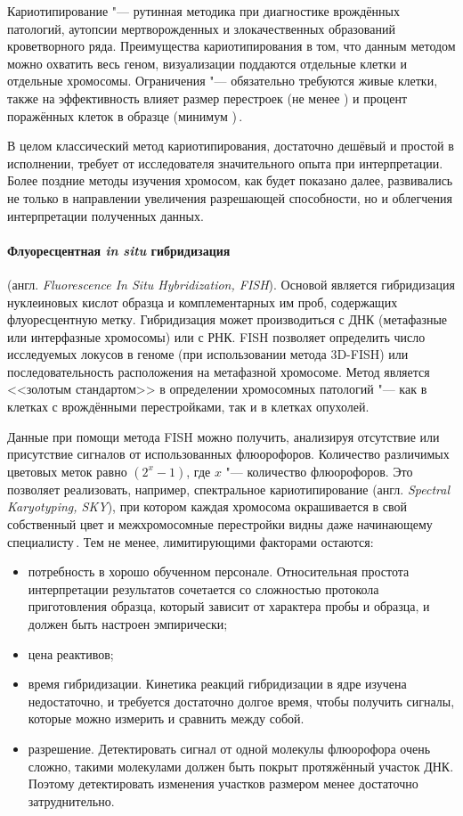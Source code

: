 \documentclass[a4paper,14pt]{extarticle}
\newcommand{\engterm}[1]{англ. \textenglish{\textit{#1}}}
\begin{document}
Кариотипирование "--- рутинная методика при диагностике врождённых патологий, аутопсии мертворожденных и злокачественных образований кроветворного ряда.
Преимущества кариотипирования в том, что данным методом можно охватить весь геном, визуализации поддаются отдельные клетки и отдельные хромосомы.
Ограничения "--- обязательно требуются живые клетки, также на эффективность влияет размер перестроек (не менее ) и процент поражённых клеток в образце (минимум )\,\citep{Sampson_2014}.

В целом классический метод кариотипирования, достаточно дешёвый и простой в исполнении, требует от исследователя значительного опыта при интерпретации.
Более поздние методы изучения хромосом, как будет показано далее, развивались не только в направлении увеличения разрешающей способности, но и облегчения интерпретации полученных данных.

\paragraph{Флуоресцентная \textit{in situ} гибридизация} (\engterm{Fluorescence In Situ Hybridization, FISH}).
Основой является гибридизация нуклеиновых кислот образца и комплементарных им проб, содержащих флуоресцентную метку.
Гибридизация может производиться с ДНК (метафазные или интерфазные хромосомы) или с РНК.
FISH позволяет определить число исследуемых локусов в геноме (при использовании метода 3D-FISH) или последовательность расположения на метафазной хромосоме.
Метод является <<золотым стандартом>> в определении хромосомных патологий "--- как в клетках с врождёнными перестройками, так и в клетках опухолей.

Данные при помощи метода FISH можно получить, анализируя отсутствие или присутствие сигналов от использованных флюорофоров.
Количество различимых цветовых меток равно $(2^x - 1)$, где  $x$ "--- количество флюорофоров.
Это позволяет реализовать, например, спектральное кариотипирование (\engterm{Spectral Karyotyping, SKY}), при котором каждая хромосома окрашивается в свой собственный цвет и межхромосомные перестройки видны даже начинающему специалисту\,\citep{Guo_2014}.
Тем не менее, лимитирующими факторами остаются:

\begin{itemize}
	\item потребность в хорошо обученном персонале.
	      Относительная простота интерпретации результатов сочетается со сложностью протокола приготовления образца, который зависит от характера пробы и образца, и должен быть настроен эмпирически;
	\item цена реактивов;
	\item время гибридизации.
	      Кинетика реакций гибридизации в ядре изучена недостаточно, и требуется достаточно долгое время, чтобы получить сигналы, которые можно измерить и сравнить между собой.
	\item разрешение.
	      Детектировать сигнал от одной молекулы флюорофора очень сложно, такими молекулами должен быть покрыт протяжённый участок ДНК.
	      Поэтому детектировать изменения участков размером менее  достаточно затруднительно.
\end{itemize}
\end{document}
